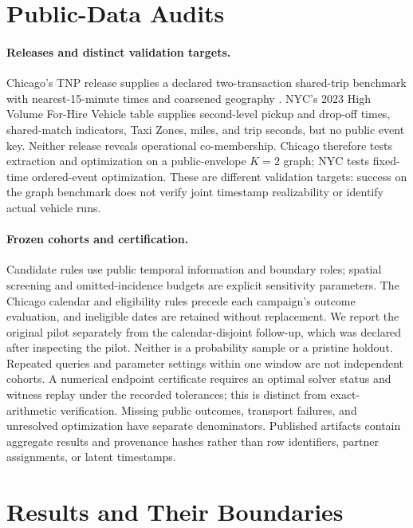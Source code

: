 \section{Public-Data Audits}
\label{sec:data}

\paragraph{Releases and distinct validation targets.}
Chicago's TNP release supplies a declared two-transaction shared-trip
benchmark with nearest-15-minute times and coarsened geography
\citep{chicagodata2026,chicagomanual2026,chicagoprivacy2026}.
NYC's 2023 High Volume For-Hire Vehicle table supplies second-level pickup and
drop-off times, shared-match indicators, Taxi Zones, miles, and trip seconds,
but no public event key. Neither release reveals operational co-membership.
Chicago therefore tests extraction and optimization on a public-envelope
$K=2$ graph; NYC tests fixed-time ordered-event optimization. These are
different validation targets: success on the graph benchmark does not verify
joint timestamp realizability or identify actual vehicle runs.

\paragraph{Frozen cohorts and certification.}
Candidate rules use public temporal information and boundary roles; spatial
screening and omitted-incidence budgets are explicit sensitivity parameters.
The Chicago calendar and eligibility rules precede each campaign's outcome
evaluation, and ineligible dates are retained without replacement. We report
the original pilot separately from the calendar-disjoint follow-up, which was
declared after inspecting the pilot. Neither is a probability sample or a
pristine holdout. Repeated queries and parameter settings within one window
are not independent cohorts. A numerical endpoint certificate requires an
optimal solver status and witness replay under the recorded tolerances;
this is distinct from exact-arithmetic verification. Missing public outcomes,
transport failures, and unresolved optimization have separate denominators.
Published artifacts contain aggregate results and provenance hashes rather
than row identifiers, partner assignments, or latent timestamps.

\section{Results and Their Boundaries}
\label{sec:results}

